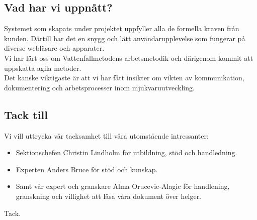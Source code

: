 \documentclass[paper=a4, fontsize=11pt,twoside]{article}
\begin{document}
\subsection{Vad har vi uppnått?}
Systemet som skapats under projektet uppfyller alla de formella kraven från kunden. 
Därtill har det en snygg och lätt användarupplevelse som fungerar på diverse 
webläsare och apparater.\\

Vi har lärt oss om Vattenfallmetodens arbetsmetodik och därigenom kommit att
uppskatta agila metoder.\\

Det kanske viktigaste är att vi har fått insikter om vikten av kommunikation, 
dokumentering och arbetsprocesser inom mjukvaruutveckling.\\

\subsection{Tack till}
Vi vill uttrycka vår tacksamhet till våra utomstående intressanter:
\begin{itemize}
  \item [] Sektionschefen Christin Lindholm för utbildning, stöd och
  handledning.
  \item [] Experten Anders Bruce för stöd och kunskap.
  \item [] Samt vår expert och granskare Alma Orucevic-Alagic för handlening,
  granskning och villighet att läsa våra dokument över helger.
\end{itemize}  
Tack.
\end{document}

